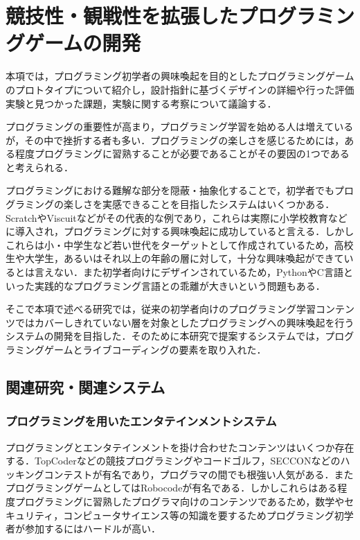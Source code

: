 \section{競技性・観戦性を拡張したプログラミングゲームの開発}
本項では，プログラミング初学者の興味喚起を目的としたプログラミングゲームのプロトタイプについて紹介し，設計指針に基づくデザインの詳細や行った評価実験と見つかった課題，実験に関する考察について議論する．

プログラミングの重要性が高まり，プログラミング学習を始める人は増えているが，その中で挫折する者も多い．プログラミングの楽しさを感じるためには，ある程度プログラミングに習熟することが必要であることがその要因の1つであると考えられる．

プログラミングにおける難解な部分を隠蔽・抽象化することで，初学者でもプログラミングの楽しさを実感できることを目指したシステムはいくつかある．ScratchやViscuitなどがその代表的な例であり，これらは実際に小学校教育などに導入され，プログラミングに対する興味喚起に成功していると言える．しかしこれらは小・中学生など若い世代をターゲットとして作成されているため，高校生や大学生，あるいはそれ以上の年齢の層に対して，十分な興味喚起ができているとは言えない．また初学者向けにデザインされているため，PythonやC言語といった実践的なプログラミング言語との乖離が大きいという問題もある．

そこで本項で述べる研究では，従来の初学者向けのプログラミング学習コンテンツではカバーしきれていない層を対象としたプログラミングへの興味喚起を行うシステムの開発を目指した．そのために本研究で提案するシステムでは，プログラミングゲームとライブコーディングの要素を取り入れた．

\subsection{関連研究・関連システム}

\subsubsection{プログラミングを用いたエンタテインメントシステム}
プログラミングとエンタテインメントを掛け合わせたコンテンツはいくつか存在する．TopCoder\cite{topcoder}などの競技プログラミングやコードゴルフ\cite{codegolf}，SECCON\cite{seccon}などのハッキングコンテストが有名であり，プログラマの間でも根強い人気がある．またプログラミングゲームとしてはRobocode\cite{robocode}が有名である．しかしこれらはある程度プログラミングに習熟したプログラマ向けのコンテンツであるため，数学やセキュリティ，コンピュータサイエンス等の知識を要するためプログラミング初学者が参加するにはハードルが高い．

